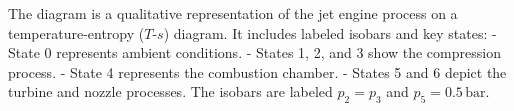 The diagram is a qualitative representation of the jet engine process on a temperature-entropy (\( T \)-\( s \)) diagram. It includes labeled isobars and key states:  
- State 0 represents ambient conditions.  
- States 1, 2, and 3 show the compression process.  
- State 4 represents the combustion chamber.  
- States 5 and 6 depict the turbine and nozzle processes.  
The isobars are labeled \( p_2 = p_3 \) and \( p_5 = 0.5 \, \text{bar} \).